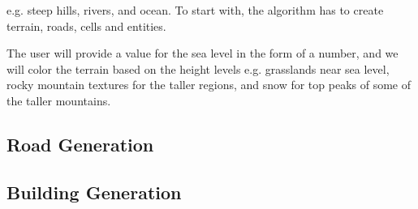 e.g. steep hills, rivers, and ocean.
To start with, the algorithm has to create terrain, roads, cells and entities. 

The user will provide a value for the sea level in the form of a number, and we will color the terrain based on the height levels e.g. grasslands near sea level, rocky mountain textures for the taller regions, and snow for top peaks of some of the taller mountains.

\subsection{Road Generation}
\subsection{Building Generation}
